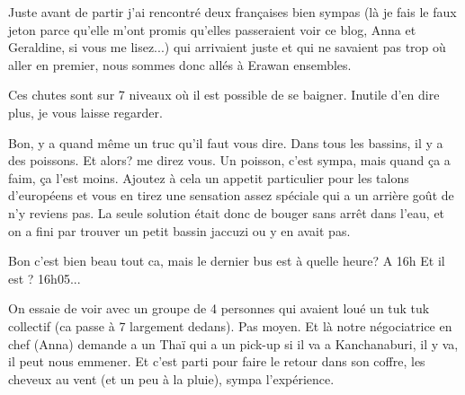 \begin{multicols}{2}
Juste avant de partir j'ai rencontré deux françaises bien sympas (là je fais le faux jeton parce qu'elle m'ont promis qu'elles passeraient voir ce blog, Anna et Geraldine, si vous me lisez...) qui arrivaient juste et qui ne savaient pas trop où aller en premier, nous sommes donc allés à Erawan ensembles.

Ces chutes sont sur 7 niveaux où il est possible de se baigner. Inutile d'en dire plus, je vous laisse regarder.





Bon, y a quand même un truc qu'il faut vous dire. Dans tous les bassins, il y a des poissons. Et alors? me direz vous. Un poisson, c'est sympa, mais quand ça a faim, ça l'est moins. Ajoutez à cela un appetit particulier pour les talons d'européens et vous en tirez une sensation assez spéciale qui a un arrière goût de n'y reviens pas. La seule solution était donc de bouger sans arrêt dans l'eau, et on a fini par trouver un petit bassin jaccuzi ou y en avait pas.

\begin{dialogue}
   Bon c'est bien beau tout ca, mais le dernier bus est à quelle heure?
   A 16h
   Et il est ?
   16h05...
\end{dialogue}

On essaie de voir avec un groupe de 4 personnes qui avaient loué un tuk tuk collectif (ca passe à 7 largement dedans). Pas moyen. Et là notre négociatrice en chef (Anna) demande a un Thaï qui a un pick-up si il va a Kanchanaburi, il y va, il peut nous emmener. Et c'est parti pour faire le retour dans son coffre, les cheveux au vent (et un peu à la pluie), sympa l'expérience.


\end{multicols}
